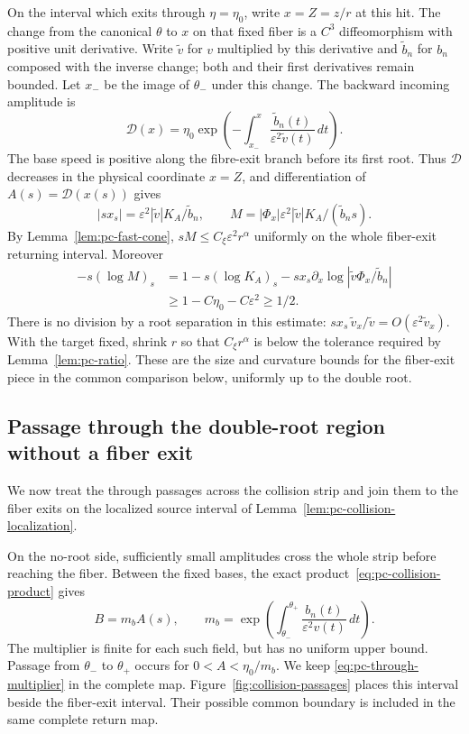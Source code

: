 On the interval which exits through $\eta=\eta_0$, write $x=Z=z/r$
at this hit. The change from the canonical
$\theta$ to $x$ on that fixed fiber is a $C^3$ diffeomorphism with
positive unit derivative. Write $\widetilde v$ for $v$ multiplied by
this derivative and $\widetilde b_n$ for $b_n$ composed with the inverse
change; both and their first derivatives remain bounded.
Let $x_-$ be the image of $\theta_-$
under this change. The backward incoming amplitude is
\[
 \mathcal D(x)=\eta_0\exp\left(-\int_{x_-}^x
             \frac{\widetilde b_n(t)}{\varepsilon^2\widetilde v(t)}\,dt\right).
\]
The base speed is positive along the fibre-exit branch before its first
root. Thus $\mathcal D$ decreases in the physical coordinate $x=Z$,
and differentiation of $A(s)=\mathcal D(x(s))$ gives
\[
 |sx_s|=\varepsilon^2|\widetilde v|K_A/\widetilde b_n,\qquad
 M=|\Phi_x|\varepsilon^2|\widetilde v|K_A/(\widetilde b_n s).
\]
By Lemma~\ref{lem:pc-fast-cone},
$sM\le C_\xi\varepsilon^2r^\alpha$ uniformly on the whole
fiber-exit returning interval. Moreover
\[
 \begin{aligned}
 -s(\log M)_s
 &=1-s(\log K_A)_s-sx_s\partial_x\log|\widetilde v\Phi_x/\widetilde b_n|\\
 &\ge1-C\eta_0-C\varepsilon^2\ge1/2.
 \end{aligned}
\]
There is no division by a root separation in this estimate:
$sx_s\,\widetilde v_x/\widetilde v=O(\varepsilon^2\widetilde v_x)$.
With the target fixed, shrink $r$ so that $C_\xi r^\alpha$ is below
the tolerance required by Lemma~\ref{lem:pc-ratio}. These are the size
and curvature bounds for the fiber-exit piece in the common comparison
below, uniformly up to the double root.

\subsection{Passage through the double-root region without a fiber exit}

We now treat the through passages across the collision strip and join them
to the fiber exits on the localized source interval of
Lemma~\ref{lem:pc-collision-localization}.

On the no-root side, sufficiently small amplitudes cross the whole
strip before reaching the fiber. Between the fixed bases, the exact
product~\eqref{eq:pc-collision-product} gives
\begin{equation}
\label{eq:pc-through-multiplier}
 B=m_b A(s),\qquad
 m_b=\exp\left(\int_{\theta_-}^{\theta_+}
                         \frac{b_n(t)}{\varepsilon^2v(t)}\,dt\right).
\end{equation}
The multiplier is finite for each such field, but has no uniform upper
bound. Passage from $\theta_-$ to $\theta_+$ occurs for $0<A<\eta_0/m_b$.
We keep \eqref{eq:pc-through-multiplier} in the complete map.
Figure~\ref{fig:collision-passages} places this interval beside the
fiber-exit interval. Their possible common boundary is included in the
same complete return map.



